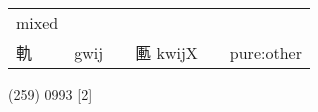 \documentclass[14pt,a4paper]{scrartcl}
\begin{document}
\begin{longtable}[c]{@{}llllll@{}}
\begin{minipage}[t]{0.14\columnwidth}
mixed
\strut\end{minipage}\tabularnewline
\begin{minipage}[t]{0.14\columnwidth}\raggedright\strut
軌
\strut\end{minipage} &
\begin{minipage}[t]{0.14\columnwidth}\raggedright\strut
gwij
\strut\end{minipage} &
\begin{minipage}[t]{0.14\columnwidth}\raggedright\strut
\strut\end{minipage} &
\begin{minipage}[t]{0.14\columnwidth}\raggedright\strut
匭 kwijX
\strut\end{minipage} &
\begin{minipage}[t]{0.14\columnwidth}\raggedright\strut
\strut\end{minipage} &
\begin{minipage}[t]{0.14\columnwidth}\raggedright\strut
pure:other
\strut\end{minipage}\tabularnewline
\bottomrule
\end{longtable}

(259) 0993 {[}2{]}
\end{document}
